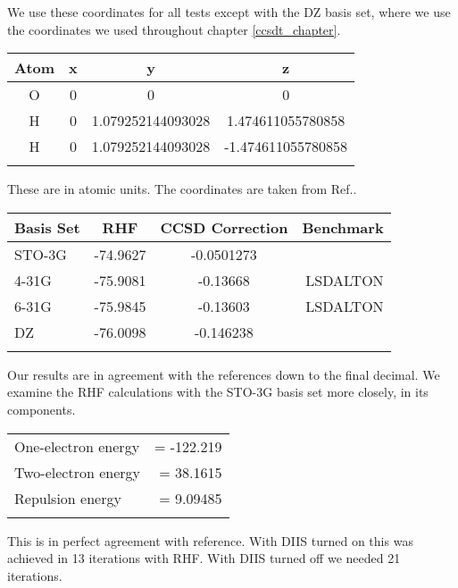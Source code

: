 We use these coordinates for all tests except with the DZ basis set, where we use the coordinates we used throughout chapter \ref{ccsdt_chapter}.  

\begin{center}
  \begin{tabular}{ c c c c }
  \hline
     Atom & x & y & z \\ \hline
     O & 0 & 0 & 0 \\
     H & 0 & 1.079252144093028 & 1.474611055780858 \\
     H & 0 & 1.079252144093028 & -1.474611055780858 \\
     \hline \\
  \end{tabular} 
\end{center} 

These are in atomic units. The coordinates are taken from Ref.\cite{ccsd_benchmark_url_stuff}.

\begin{center}
\begin{tabular}{ l c c r }
	\hline
  	Basis Set & RHF & CCSD Correction & Benchmark \\ \hline
  	STO-3G & -74.9627 & -0.0501273 & \cite{ccsd_benchmark_url_stuff} \\ 
  	4-31G & -75.9081 & -0.13668 & LSDALTON \\ 
  	6-31G & -75.9845 & -0.13603 & LSDALTON \\ 
  	DZ & -76.0098 & -0.146238 & \cite{CCSDT-ref1} \\ \hline
  	\\
	\end{tabular}
\end{center}

Our results are in agreement with the references down to the final decimal. We examine the RHF calculations with the STO-3G basis set more closely, in its components.  \\

\begin{center}
\begin{tabular}{ l r }
  	One-electron energy & = -122.219 \\ 
  	Two-electron energy & = 38.1615 \\
  	Repulsion energy & = 9.09485 \\
  	\\
	\end{tabular}
\end{center}

This is in perfect agreement with reference. With DIIS turned on this was achieved in 13 iterations with RHF. With DIIS turned off we needed 21 iterations.

